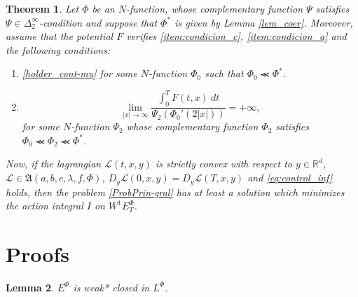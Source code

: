 \documentclass[twoside]{article}
\newtheorem{thm}{Theorem}[section]
\newtheorem{lem}[thm]{Lemma}
\theoremstyle{remark}
\newcommand{\lphi}{L^{\Phi}}
\newcommand{\ephi}{E^{\Phi}}
\newcommand{\wphie}{W^{1}\ephi}
\newcommand{\rr}{\mathbb{R}}
\begin{document}
\begin{thm}\label{coercitividad-r} Let $\Phi$ be an $N$-function, whose complementary function $\Psi$ satisfies  
$\Psi\in\Delta_2^{\infty}$-condition and suppose that $\Phi^*$ is given by Lemma \ref{lem_coer}. 
Moreover, assume that the potential $F$ verifies \ref{item:condicion_c}, \ref{item:condicion_a} and 
the following conditions:

\begin{enumerate}
 \item  \eqref{holder_cont-mu}  for some
 $N$-function  $\Phi_0$ such that $\Phi_0\llcurly\Phi^*$.

 \item \begin{equation}\label{eq:propiedad-coercividad-phi0}
\lim_{|x|\to\infty}\frac{\int_{0}^{T}F(t,x)\ dt}{\Psi_2(\Phi_0'(2|x|))}=+\infty,\tag{$A_5$}
\end{equation}
for some $N$-function $\Psi_2$ whose complementary function $\Phi_2$ satisfies $\Phi_0\llcurly \Phi_2\llcurly \Phi^*$.
\end{enumerate}

Now,  if the lagrangian $\mathcal{L}(t,x,y)$ is strictly convex  with respect to $y\in\rr^d$,
$\mathcal{L}\in \mathfrak{A}(a,b,c,\lambda,f,\Phi)$, 
$D_y\mathcal{L}(0,x,y)=D_y\mathcal{L}(T,x,y)$
and \eqref{eq:control_inf} holds,
then the problem \eqref{ProbPrin-gral} has at least a solution which minimizes the action integral $I$ on $\wphie_T$.

\end{thm}









\section{Proofs}\label{sec:proofs}



\begin{lem}\label{lem:deb*cerrado}
$\ephi$ is weak* closed in $\lphi$.
\end{lem}
\end{document}
